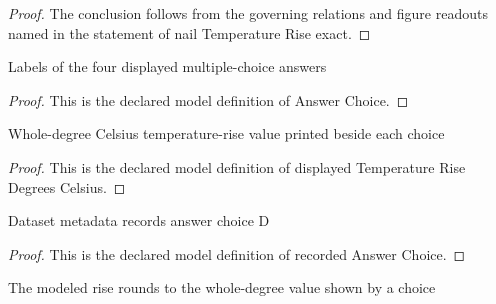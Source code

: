\begin{proof}
  The conclusion follows from the governing relations and figure readouts named in the statement of nail Temperature Rise exact.
\end{proof}
\begin{definition}
  \label{def:physics:phyx-mini-0486:phyxminiproblems-problemphyxmini0486-answerchoice}
  Labels of the four displayed multiple-choice answers
\end{definition}
\begin{proof}
  This is the declared model definition of Answer Choice.
\end{proof}
\begin{definition}
  \label{def:physics:phyx-mini-0486:phyxminiproblems-problemphyxmini0486-displayedtemperaturerisedegreescelsius}
  Whole-degree Celsius temperature-rise value printed beside each choice
\end{definition}
\begin{proof}
  This is the declared model definition of displayed Temperature Rise Degrees Celsius.
\end{proof}
\begin{definition}
  \label{def:physics:phyx-mini-0486:phyxminiproblems-problemphyxmini0486-recordedanswerchoice}
  Dataset metadata records answer choice D
\end{definition}
\begin{proof}
  This is the declared model definition of recorded Answer Choice.
\end{proof}
\begin{definition}
  \label{def:physics:phyx-mini-0486:phyxminiproblems-problemphyxmini0486-roundstodisplayedwholedegree}
  The modeled rise rounds to the whole-degree value shown by a choice
\end{definition}
